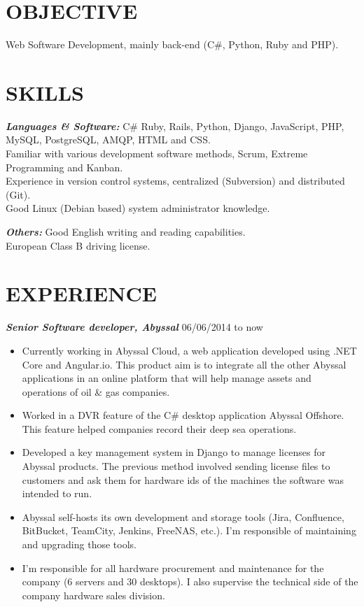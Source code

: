 \documentclass[line,margin]{resume}
\begin{document}
\address{Currently living in Porto, Portugal}
\address{helder.tavares.silva@gmail.com or +351917534732}

\begin{resume}

\section{OBJECTIVE} Web Software Development, mainly back-end (C\#, Python, Ruby and PHP).

\section{SKILLS}
    {\sl\bf Languages \& Software:}
        C\# Ruby, Rails, Python, Django, JavaScript, PHP, MySQL, PostgreSQL, AMQP, HTML and CSS.\\
        Familiar with various development software methods, Scrum, Extreme Programming and Kanban.\\
        Experience in version control systems, centralized (Subversion) and distributed (Git).\\
        Good Linux (Debian based) system administrator knowledge.

    {\sl\bf Others:}
        Good English writing and reading capabilities.\\
        European Class B driving license.

\section{EXPERIENCE}
    {\sl\bf Senior Software developer, Abyssal} \hfill 06/06/2014 to now
    \begin{itemize}
		\item Currently working in Abyssal Cloud, a web application developed using .NET Core and Angular.io. This product aim is to integrate all the other Abyssal applications in an online platform that will help manage assets and operations of oil \& gas companies.
        \item Worked in a DVR feature of the C\# desktop application Abyssal Offshore. This feature helped companies record their deep sea operations.
		\item Developed a key management system in Django to manage licenses for Abyssal products. The previous method involved sending license files to customers and ask them for hardware ids of the machines the software was intended to run.
		\item Abyssal self-hosts its own development and storage tools (Jira, Confluence, BitBucket, TeamCity, Jenkins, FreeNAS, etc.). I'm responsible of maintaining and upgrading those tools.
		\item I’m responsible for all hardware procurement and maintenance for the company (6 servers and 30 desktops). I also supervise the technical side of the company hardware sales division.
    \end{itemize}


\end{resume}
\end{document}
